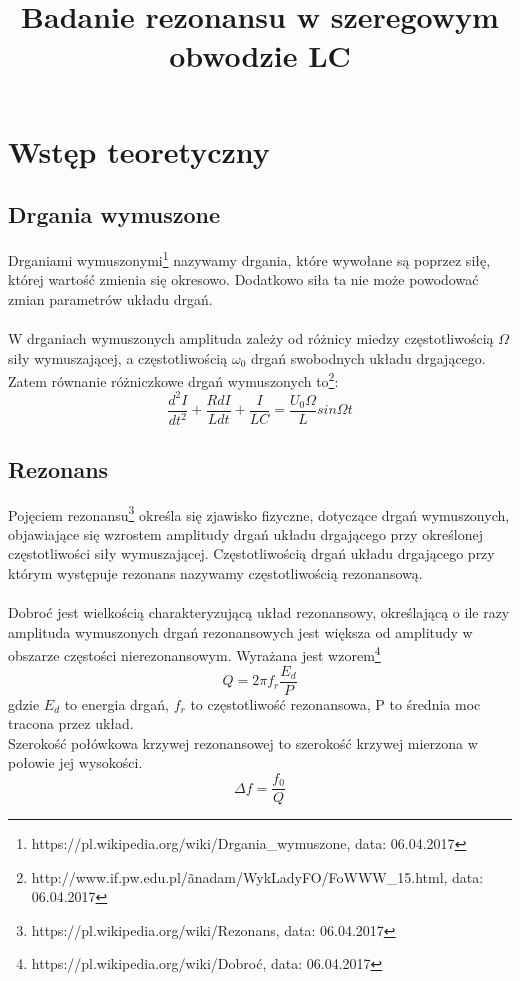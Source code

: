\documentclass{article}
\begin{document}
\title{\huge\bfseries Badanie rezonansu w szeregowym obwodzie LC}
\date{}
\author{}
\maketitle
\section{Wstęp teoretyczny}
\subsection{Drgania wymuszone}
Drganiami wymuszonymi\footnote{https://pl.wikipedia.org/wiki/Drgania\_wymuszone, data: 06.04.2017} nazywamy drgania, które wywołane są poprzez siłę, której wartość zmienia się okresowo. Dodatkowo siła ta nie może powodować zmian parametrów układu drgań.\\\\
W drganiach wymuszonych amplituda zależy od różnicy miedzy częstotliwością $\Omega$ siły wymuszającej, a częstotliwością $\omega_0$ drgań swobodnych układu drgającego.
Zatem równanie różniczkowe drgań wymuszonych to\footnote{http://www.if.pw.edu.pl/\~anadam/WykLadyFO/FoWWW\_15.html, data: 06.04.2017}:
$$\frac{d^2I}{dt^2}+\frac{RdI}{Ldt}+\frac{I}{LC} = \frac{U_0\Omega}{L} sin\Omega t$$
\subsection{Rezonans}
Pojęciem rezonansu\footnote{https://pl.wikipedia.org/wiki/Rezonans, data: 06.04.2017} określa się zjawisko fizyczne, dotyczące drgań wymuszonych, objawiające się wzrostem amplitudy drgań układu drgającego przy określonej częstotliwości siły wymuszającej. Częstotliwością drgań układu drgającego przy którym występuje rezonans nazywamy częstotliwością rezonansową.\\\\
Dobroć jest wielkością charakteryzującą układ rezonansowy, określającą o ile razy amplituda wymuszonych drgań rezonansowych jest większa od amplitudy w obszarze częstości nierezonansowym. Wyrażana jest wzorem\footnote{https://pl.wikipedia.org/wiki/Dobroć, data: 06.04.2017}
$$Q = 2\pi f_r\frac{E_d}{P}$$
gdzie $E_d$ to energia drgań, $f_r$ to częstotliwość rezonansowa, P to średnia moc tracona przez układ.\\
Szerokość połówkowa krzywej rezonansowej to szerokość krzywej mierzona w połowie jej wysokości.
$$\Delta f = \frac{f_0}{Q}$$
\end{document}
